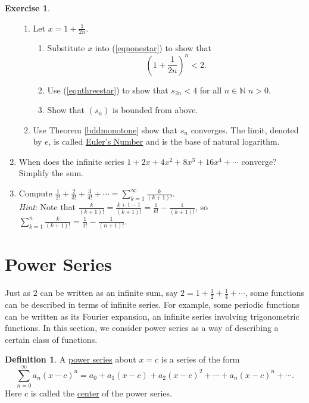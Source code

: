 \documentclass[12pt,letterpaper]{book}
\numberwithin{equation}{section}
\theoremstyle{definition}
\newtheorem{defi}[thm]{\textbf{Definition}}
\newtheorem{exercise}{\textbf{Exercise}}[chapter]
\begin{document}
\begin{exercise}
\begin{enumerate}[\bfseries 1.]
\begin{enumerate}
\item Let $x=\displaystyle{1+\frac{1}{2n}}$.
\begin{enumerate}
\item Substitute $x$ into (\ref{eqnonestar}) to show that
\begin{equation}\label{eqnthreestar}\left(1+\frac{1}{2n}\right)^n<2.\end{equation}
\item Use (\ref{eqnthreestar}) to show that $s_{2n}<4$ for all $n\in \mathbb{N}$ $n>0$.
\item Show that $(s_n)$ is bounded from above.
\end{enumerate}

\item Use Theorem \ref{bddmonotone} show that $s_n$ converges. The limit, denoted by $e$, is called \underline{Euler's Number} and is the base of natural logarithm.
\end{enumerate}

\item When does the infinite series $1+2x+4x^2+8x^3+16x^4+\cdots$ converge? Simplify the sum.

\item Compute $\displaystyle{\frac{1}{2!}+\frac{2}{3!}+\frac{3}{4!}+\cdots=\sum_{k=1}^\infty\frac{k}{(k+1)!}}$.\\
\textit{Hint}: Note that $\displaystyle{\frac{k}{(k+1)!}=\frac{k+1-1}{(k+1)!}=\frac{1}{k!}-\frac{1}{(k+1)!}}$, so $\displaystyle{\sum_{k=1}^n \frac{k}{(k+1)!}=\frac{1}{1!}-\frac{1}{(n+1)!}}$.
\end{enumerate}

\end{exercise}

\section{Power Series}

Just as $2$ can be written as an infinite sum, say $2=1+\frac{1}{2}+\frac{1}{4}+\cdots$, some functions can be described in terms of infinite series. For example, some periodic functions can be written as its Fourier expansion, an infinite series involving trigonometric functions. In this section, we consider power series as a way of describing a certain class of functions.

\begin{defi} A \underline{power series} about $x=c$ is a series of the form
$$\sum_{n=0}^\infty a_n(x-c)^n=a_0+a_1(x-c)+a_2(x-c)^2+\cdots+a_n(x-c)^n+\cdots.$$
Here $c$ is called the \underline{center} of the power series.
\end{defi}
\end{document}
